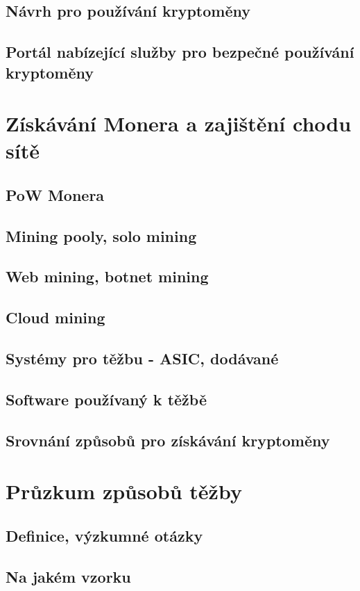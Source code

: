 \documentclass[
  printed, %
  table,   %
  nolof,     %
  nolot,     %
           oneside, color
]{fithesis3}
\begin{document}
\section{Návrh pro používání kryptoměny}
\section{Portál nabízející služby pro bezpečné používání kryptoměny}



\chapter{Získávání Monera a zajištění chodu sítě}
\section{PoW Monera}
\section{Mining pooly, solo mining}
\section{Web mining, botnet mining}
\section{Cloud mining}
\section{Systémy pro těžbu - ASIC, dodávané}
\section{Software používaný k těžbě}
\section{Srovnání způsobů pro získávání kryptoměny}

\chapter{Průzkum způsobů těžby}
\section{Definice, výzkumné otázky}
\section{Na jakém vzorku}
\end{document}
